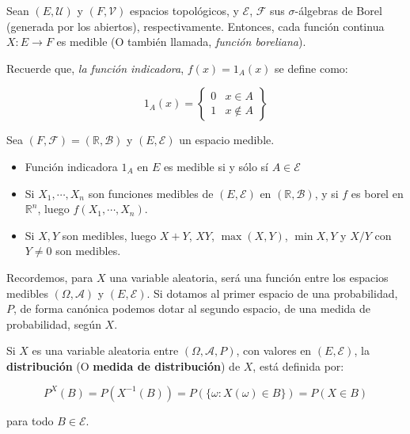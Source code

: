 \begin{theorem}
	Sean $(E, \mathcal{U})$ y $(F, \mathcal{V})$ espacios topológicos, y $\mathcal{E}$, $\mathcal{F}$ sus $\sigma$-álgebras de Borel (generada por los abiertos), respectivamente. Entonces, cada función continua $X: E \rightarrow F$ es medible (O también llamada, \textit{función boreliana}).
\end{theorem}

Recuerde que, \textit{la función indicadora}, $f(x) = 1_A (x)$ se define como:

\[
	1_A (x) = \left\{  \begin{array}{lc}
		0 & x \in A \\
		1 & x \notin A
	\end{array} \right\}
\]

\begin{theorem}
	Sea $(F, \mathcal{F}) = (\mathbb{R}, \mathcal{B})$ y $(E, \mathcal{E})$ un espacio medible.

	\begin{itemize}
		\item Función indicadora $1_A$ en $E$ es medible si y sólo sí $A \in \mathcal{E}$
		\item Si $X_1, \cdots, X_n$ son funciones medibles de $(E, \mathcal{E})$ en $(\mathbb{R}, \mathcal{B})$, y si $f$ es borel en $\mathbb{R}^n$, luego $f(X_1, \cdots, X_n)$.
		\item Si $X, Y$ son medibles, luego $X + Y$, $XY$, $\max(X,Y)$, $\min{X,Y}$ y $X/Y$ con $Y \neq 0$ son medibles.
	\end{itemize}

\end{theorem}

Recordemos, para $X$ una variable aleatoria, será una función entre los espacios medibles $(\Omega, \mathcal{A})$ y $(E, \mathcal{E})$. Si dotamos al primer espacio de una probabilidad, $P$, de forma canónica podemos dotar al segundo espacio, de una medida de probabilidad, según $X$.

\begin{boxDef}
	Si $X$ es una variable aleatoria entre $(\Omega, \mathcal{A}, P)$, con valores en $(E, \mathcal{E})$, la \textbf{distribución} (O \textbf{medida de distribución}) de $X$, está definida por:

	\[
		P^{X} (B) = P(X^{-1} (B)) =  P(\{ \omega : X(\omega) \in B \}) = P(X \in B)
	\] 

	para todo $B \in \mathcal{E}$. 
\end{boxDef}


